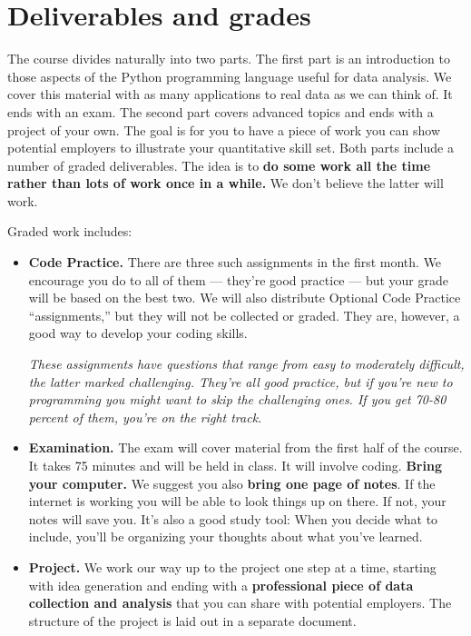 \documentclass[11pt]{article}
\begin{document}
\section*{Deliverables and grades}

The course divides naturally into two parts.
The first part is an introduction to those aspects of the Python programming language
useful for data analysis.
We cover this material with as many applications to real data as we can think of.
It ends with an exam.
The second part covers advanced topics and ends with a project of your own.
The goal is for you to have a piece of work you can show potential employers to
illustrate your quantitative skill set.
Both parts include a number of graded deliverables.
The idea is to {\bf do some work all the time rather than lots of work once in a while.}
We don't believe the latter will work.

Graded work includes:
%
\begin{itemize}

\item {\bf Code Practice.\/}
There are three such assignments in the first month.
We encourage you do to all of them --- they're good practice ---
but your grade will be based on the best two.
We will also distribute Optional Code Practice ``assignments,''
but they will not be collected or graded.
They are, however, a good way to develop your coding skills.

{\it These assignments have questions that range from easy to moderately difficult,
the latter marked {\it challenging\/}.
They're all good practice, but if you're new to programming you
might want to skip the challenging ones.
If you get 70-80 percent of them, you're on the right track. \/}

\item {\bf Examination.\/}
The exam will cover material from the first half of the course.
It takes 75 minutes and will be held in class.
It will involve coding.
{\bf Bring your computer.\/}
We suggest you also {\bf bring one page of notes\/}.
If the internet is working you will be able to look things up on there.
If not, your notes will save you.
It's also a good study tool:  When you decide what to include,
you'll be organizing your thoughts about what you've learned.

\item {\bf Project.\/}
We work our way up to the project one step at a time, starting with idea generation and ending
with a {\bf professional piece of data collection and analysis\/}
that you can share with potential employers.
The structure of the project is laid out in a separate document.

\end{itemize}
\end{document}
